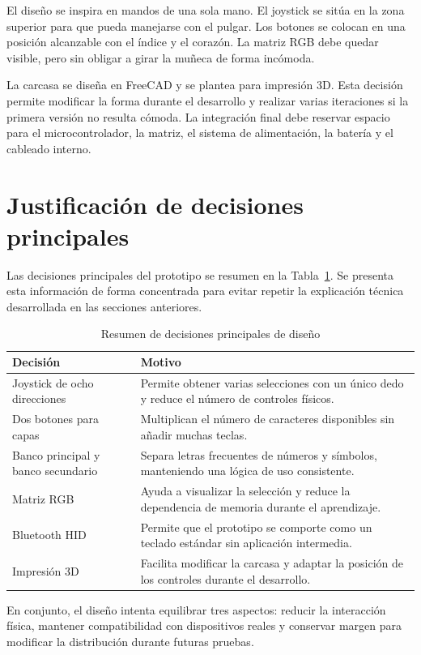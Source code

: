 El diseño se inspira en mandos de una sola mano. El joystick se sitúa en la zona superior para que pueda manejarse con el pulgar. Los botones se colocan en una posición alcanzable con el índice y el corazón. La matriz RGB debe quedar visible, pero sin obligar a girar la muñeca de forma incómoda.

La carcasa se diseña en FreeCAD y se plantea para impresión 3D. Esta decisión permite modificar la forma durante el desarrollo y realizar varias iteraciones si la primera versión no resulta cómoda. La integración final debe reservar espacio para el microcontrolador, la matriz, el sistema de alimentación, la batería y el cableado interno.

\section{Justificación de decisiones principales}
\label{sec:justificacion-decisiones-principales}

Las decisiones principales del prototipo se resumen en la Tabla~\ref{tab:justificacion-decisiones}. Se presenta esta información de forma concentrada para evitar repetir la explicación técnica desarrollada en las secciones anteriores.

\begin{table}[H]
    \centering
    \caption{Resumen de decisiones principales de diseño}
    \label{tab:justificacion-decisiones}
    \begin{tabularx}{\textwidth}{@{}p{}X@{}}
        \toprule
        \textbf{Decisión} & \textbf{Motivo} \\
        \midrule
        Joystick de ocho direcciones & Permite obtener varias selecciones con un único dedo y reduce el número de controles físicos. \\
        Dos botones para capas & Multiplican el número de caracteres disponibles sin añadir muchas teclas. \\
        Banco principal y banco secundario & Separa letras frecuentes de números y símbolos, manteniendo una lógica de uso consistente. \\
        Matriz RGB & Ayuda a visualizar la selección y reduce la dependencia de memoria durante el aprendizaje. \\
        Bluetooth HID & Permite que el prototipo se comporte como un teclado estándar sin aplicación intermedia. \\
        Impresión 3D & Facilita modificar la carcasa y adaptar la posición de los controles durante el desarrollo. \\
        \bottomrule
    \end{tabularx}
\end{table}

En conjunto, el diseño intenta equilibrar tres aspectos: reducir la interacción física, mantener compatibilidad con dispositivos reales y conservar margen para modificar la distribución durante futuras pruebas.
